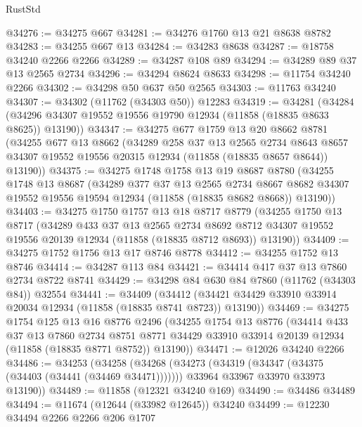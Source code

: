 \begin{lexlean}{RustStd}
\begin{coremodule}
@34276 := @34275 @667
@34281 := @34276 @1760 @13 @21 @8638 @8782
@34283 := @34255 @667 @13
@34284 := @34283 @8638
@34287 := @18758 @34240 @2266 @2266
@34289 := @34287 @108 @89
@34294 := @34289 @89 @37 @13 @2565 @2734
@34296 := @34294 @8624 @8633
@34298 := @11754 @34240 @2266
@34302 := @34298 @50 @637 @50 @2565
@34303 := @11763 @34240
@34307 := @34302 (@11762 (@34303 @50)) @12283
@34319 := @34281
    (@34284 (@34296 @34307 @19552 @19556 @19790 @12934 (@11858 (@18835 @8633 @8625)) @13190))
@34347 := @34275
    @677
    @1759
    @13
    @20
    @8662
    @8781
    (@34255
      @677
      @13
      @8662
      (@34289
        @258
        @37
        @13
        @2565
        @2734
        @8643
        @8657
        @34307
        @19552
        @19556
        @20315
        @12934
        (@11858 (@18835 @8657 @8644))
        @13190))
@34375 := @34275
    @1748
    @1758
    @13
    @19
    @8687
    @8780
    (@34255
      @1748
      @13
      @8687
      (@34289
        @377
        @37
        @13
        @2565
        @2734
        @8667
        @8682
        @34307
        @19552
        @19556
        @19594
        @12934
        (@11858 (@18835 @8682 @8668))
        @13190))
@34403 := @34275
    @1750
    @1757
    @13
    @18
    @8717
    @8779
    (@34255
      @1750
      @13
      @8717
      (@34289
        @433
        @37
        @13
        @2565
        @2734
        @8692
        @8712
        @34307
        @19552
        @19556
        @20139
        @12934
        (@11858 (@18835 @8712 @8693))
        @13190))
@34409 := @34275 @1752 @1756 @13 @17 @8746 @8778
@34412 := @34255 @1752 @13 @8746
@34414 := @34287 @113 @84
@34421 := @34414 @417 @37 @13 @7860 @2734 @8722 @8741
@34429 := @34298 @84 @630 @84 @7860 (@11762 (@34303 @84)) @32554
@34441 := @34409
    (@34412 (@34421 @34429 @33910 @33914 @20034 @12934 (@11858 (@18835 @8741 @8723)) @13190))
@34469 := @34275
    @1754
    @125
    @13
    @16
    @8776
    @2496
    (@34255
      @1754
      @13
      @8776
      (@34414
        @433
        @37
        @13
        @7860
        @2734
        @8751
        @8771
        @34429
        @33910
        @33914
        @20139
        @12934
        (@11858 (@18835 @8771 @8752))
        @13190))
@34471 := @12026 @34240 @2266
@34486 := @34253
    (@34258
      (@34268
        (@34273 (@34319 (@34347 (@34375 (@34403 (@34441 (@34469 @34471)))))))
        @33964
        @33967
        @33970
        @33973
        @13190))
@34489 := @11858 (@12321 @34240 @169)
@34490 := @34486 @34489
@34494 := @11674 (@12644 (@33982 @12645)) @34240
@34499 := @12230 @34494 @2266 @2266 @206 @1707

\end{coremodule}
\end{lexlean}
